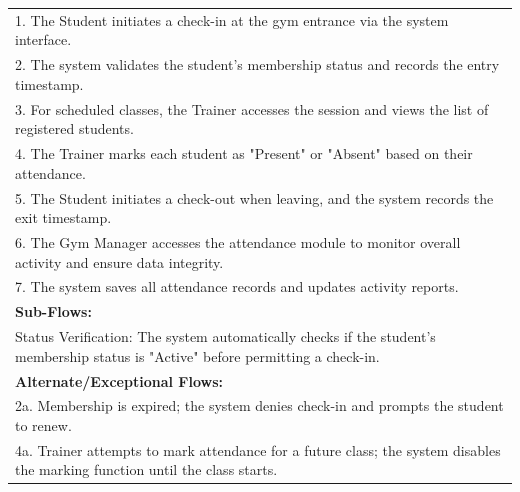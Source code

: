\documentclass[12pt, a4paper]{article}
\begin{document}
\begin{table}[H]
\begin{tabularx}{\textwidth}{X}
            1. The Student initiates a check-in at the gym entrance via the system interface.\\
            2. The system validates the student's membership status and records the entry timestamp.\\
            3. For scheduled classes, the Trainer accesses the session and views the list of registered students.\\
            4. The Trainer marks each student as "Present" or "Absent" based on their attendance.\\
            5. The Student initiates a check-out when leaving, and the system records the exit timestamp.\\
            6. The Gym Manager accesses the attendance module to monitor overall activity and ensure data integrity.\\
            7. The system saves all attendance records and updates activity reports.\\
        
        \textbf{Sub-Flows:} \\
        Status Verification: The system automatically checks if the student's membership status is "Active" before permitting a check-in. \\
        \textbf{Alternate/Exceptional Flows:} \\
        2a. Membership is expired; the system denies check-in and prompts the student to renew. \\
        4a. Trainer attempts to mark attendance for a future class; the system disables the marking function until the class starts. \\
        \hline
    \end{tabularx}
\end{table}
\end{document}
